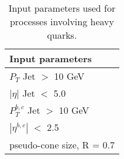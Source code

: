 \begin{table}[hbt]
\begin{center}
\renewcommand{\arraystretch}{1.2}
\begin{tabular}{|l|}\hline
Input parameters   \\ \hline
$P_T$ Jet $>$ 10 GeV \\ \hline
$| \eta |$ Jet $<$ 5.0 \\ \hline
$P^{b,c}_T$ Jet $>$ 10 GeV  \\ \hline
$| \eta^{b,c} |$ $<$ 2.5 \\ \hline
pseudo-cone size, R = 0.7 \\ \hline
\end{tabular}
\caption{Input parameters used for processes involving heavy quarks.
\label{tab:input_params1}}
\end{center}
\end{table}


